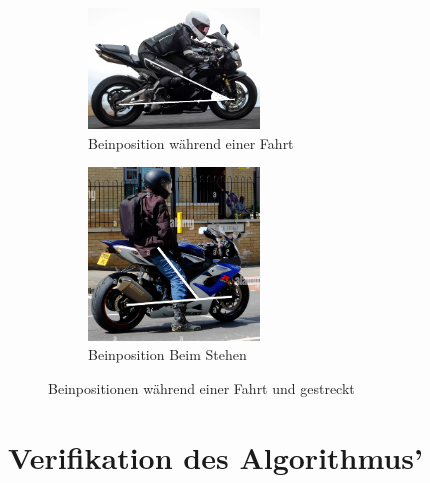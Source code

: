 \begin{figure}[H]
	\centering
	\begin{subfigure}{\textwidth}
		\centering
		\includegraphics[width=0.5\textwidth]{Bilder/MotorbikeDriving2.png}
		\caption{Beinposition während einer Fahrt}
		\label{fig:MotorbikeDriving}
	\end{subfigure}
	\hfill
	\begin{subfigure}{\textwidth}
		\centering
		\includegraphics[width=0.5\textwidth]{Bilder/MotorbikeStanding2.png}
		\caption{Beinposition Beim Stehen}
		\label{fig:MotorbikeStanding2}
	\end{subfigure}
	\caption{Beinpositionen während einer Fahrt und gestreckt}
	\label{fig:MotorbikeDrivingStanding}
\end{figure}


\section{Verifikation des Algorithmus'}
%
%
%


